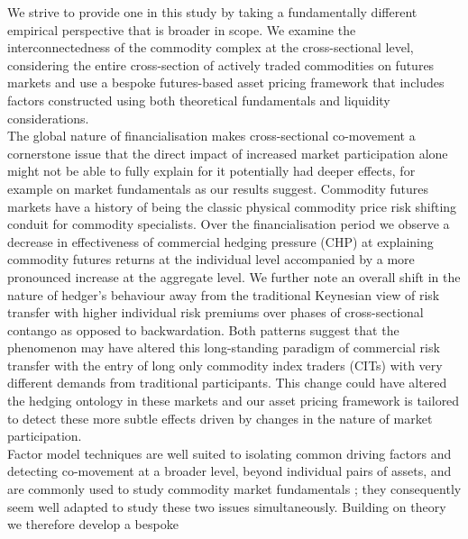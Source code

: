 \documentclass[
  authoryear,
  preprint,
  3p]{elsarticle}
\begin{document}
We strive to provide one in this study by taking a fundamentally
different empirical perspective that is broader in scope. We examine the
interconnectedness of the commodity complex at the cross-sectional
level, considering the entire cross-section of actively traded
commodities on futures markets and use a bespoke futures-based asset
pricing framework that includes factors constructed using both
theoretical fundamentals and liquidity considerations.\\
The global nature of financialisation makes cross-sectional co-movement
a cornerstone issue that the direct impact of increased market
participation alone might not be able to fully explain for it
potentially had deeper effects, for example on market fundamentals as
our results suggest. Commodity futures markets have a history of being
the classic physical commodity price risk shifting conduit for commodity
specialists. Over the financialisation period we observe a decrease in
effectiveness of commercial hedging pressure (CHP) at explaining
commodity futures returns at the individual level accompanied by a more
pronounced increase at the aggregate level. We further note an overall
shift in the nature of hedger's behaviour away from the traditional
Keynesian view of risk transfer with higher individual risk premiums
over phases of cross-sectional contango as opposed to backwardation.
Both patterns suggest that the phenomenon may have altered this
long-standing paradigm of commercial risk transfer with the entry of
long only commodity index traders (CITs) with very different demands
from traditional participants. This change could have altered the
hedging ontology in these markets and our asset pricing framework is
tailored to detect these more subtle effects driven by changes in the
nature of market participation.\\
Factor model techniques are well suited to isolating common driving
factors and detecting co-movement
\citep{fama_common_1993, carhart_persistence_1997, asness_devil_2013, fama_five_factor_2015, hou_digesting_2015, asness_fact_2015, frazzini_betting_2014, asness_quality_2019}
at a broader level, beyond individual pairs of assets, and are commonly
used to study commodity market fundamentals
\citep{schwartz_short_2000, miffre_momentum_2007, gorton_fundamentals_2012, cortazar_commodity_2013, yang_investment_2013, daskalaki_factors_2014, szymanowska_anatomy_2014, fernandez_skewness_2018, bakshi_understanding_2019, boons_basis_2019, sakkas_factor_2020};
they consequently seem well adapted to study these two issues
simultaneously. Building on theory we therefore develop a bespoke
\end{document}

